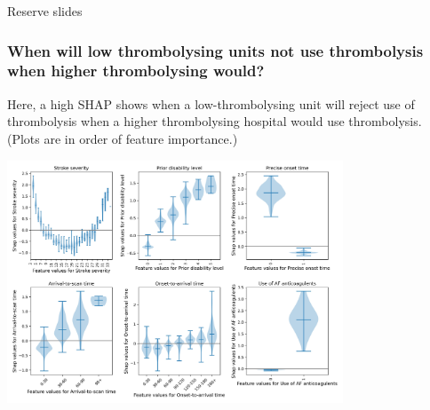\documentclass[xcolor={usenames,dvipsnames}]{beamer}
\begin{document}


\begin{frame}{}
\end{frame}

\begin{frame}{Reserve slides}
\end{frame}


\begin{frame}
\frametitle{When will low thrombolysing units not use thrombolysis when higher thrombolysing would?}

\footnotesize{Here, a high SHAP shows when a low-thrombolysing unit will reject use of thrombolysis when a higher thrombolysing hospital would use thrombolysis. (Plots are in order of feature importance.)}

\begin{center}
\includegraphics[width=0.75\textwidth]{./images/xgb_predicting_difference_shap_violin.jpg}
\end{center}
\end{frame}
\end{document}
